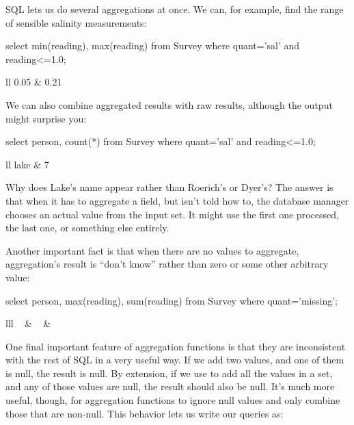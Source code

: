 SQL lets us do several aggregations at once. We can, for example, find
the range of sensible salinity measurements:

\begin{VerbIn}
select min(reading), max(reading) from Survey where quant='sal' and reading<=1.0;
\end{VerbIn}

\begin{sqltable}{ll}
0.05 & 0.21 \\
\end{sqltable}

We can also combine aggregated results with raw results, although the
output might surprise you:

\begin{VerbIn}
select person, count(*) from Survey where quant='sal' and reading<=1.0;
\end{VerbIn}

\begin{sqltable}{ll}
lake & 7 \\
\end{sqltable}

Why does Lake's name appear rather than Roerich's or Dyer's? The answer
is that when it has to aggregate a field, but isn't told how to, the
database manager chooses an actual value from the input set. It might
use the first one processed, the last one, or something else entirely.

Another important fact is that when there are no values to aggregate,
aggregation's result is ``don't know'' rather than zero or some other
arbitrary value:

\begin{VerbIn}
select person, max(reading), sum(reading) from Survey where quant='missing';
\end{VerbIn}

\begin{sqltable}{lll}
~ & ~ & ~ \\
\end{sqltable}

One final important feature of aggregation functions is that they are
inconsistent with the rest of SQL in a very useful way. If we add two
values, and one of them is null, the result is null. By extension, if we
use  to add all the values in a set, and any of those values
are null, the result should also be null. It's much more useful, though,
for aggregation functions to ignore null values and only combine those
that are non-null. This behavior lets us write our queries as:

